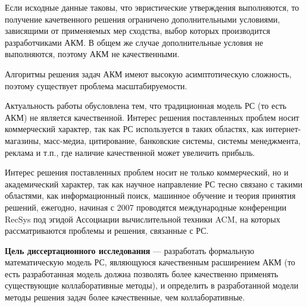 
Если исходные данные таковы, что эвристические утверждения выполняются,
то получение качетвенного решения
ограничено дополнительными условиями, зависящими от применяемых
мер сходства, выбор которых производится разработчиками АКМ.
В общем же случае дополнительные условия не выполняются, поэтому АКМ
не качественными.

Алгоритмы решения задач АКМ имеют высокую асимптотическую сложность,
поэтому существует проблема масштабируемости.

Актуальность работы обусловлена тем, что традиционная модель РС (то есть АКМ)
не является качественной. Интерес решения
поставленных проблем носит коммерческий характер,
так как РС используется в таких областях, как интернет-магазины, масс-медиа,
цитирование, банковские системы, системы менеджмента, реклама и т.п.,
где наличие качественной может увеличить прибыль.

Интерес решения поставленных проблем носит не только коммерческий, но и
академический характер, так как научное направление РС тесно связано с такими
областями, как информационный поиск, машинное обучение и теория принятия
решений, ежегодно, начиная с 2007 проводятся международные конференции RecSys
под эгидой Ассоциации вычислительной техники ACM, на которых рассматриваются
проблемы и решения, связанные с РС.

{\bf Цель диссертационного исследования} --- разработать
формальную математическую модель РС, являющуюся качественным расширением
АКМ (то есть разработанная модель должна позволять более качественно
применять существующие коллаборативные методы), и определить в разработанной модели
методы решения задач более качественные, чем коллаборативные.

